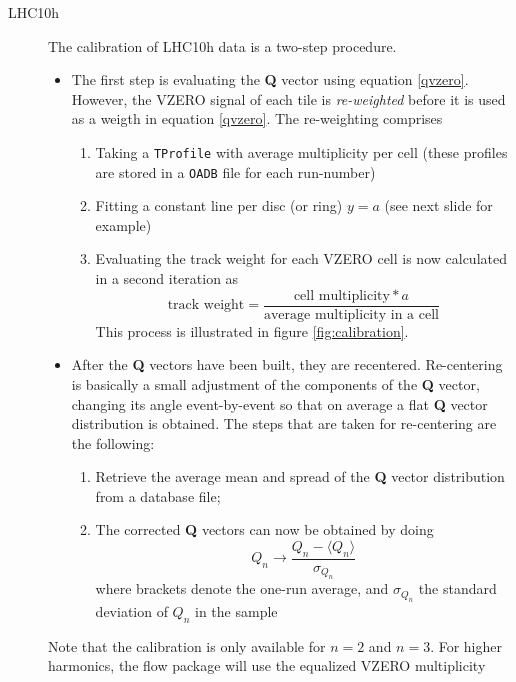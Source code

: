 \documentclass[a4paper]{book}
\numberwithin{equation}{subsection}
\begin{document}
\begin{description}
    \item [LHC10h]
The calibration of LHC10h data is a two-step procedure. 
\begin{itemize}
\item The first step is evaluating the \textbf{Q} vector using equation \ref{qvzero}. However, the VZERO signal of each tile is \emph{re-weighted} before it is used as a weigth in equation \ref{qvzero}. The re-weighting comprises 
\begin{enumerate}
\item Taking a \texttt{TProfile} with average multiplicity per cell (these profiles are stored in a \texttt{OADB} file for each run-number)
\item Fitting a constant line per disc (or ring) $y = a$ (see next slide for example)
\item Evaluating the track weight for each VZERO cell is now calculated in a second iteration as
\begin{equation}
\mbox{track weight} = \frac{\mbox{cell multiplicity} * a}{\mbox{average multiplicity in a cell}} \nonumber
\end{equation}
This process is illustrated in figure \ref{fig:calibration}.
\end{enumerate}
\item After the \textbf{Q} vectors have been built, they are recentered. Re-centering is basically a small adjustment of the components of the \textbf{Q} vector, changing its angle event-by-event so that on average a flat \textbf{Q} vector distribution is obtained. The steps that are taken for re-centering are the following:
\begin{enumerate}
\item Retrieve the average mean and spread of the \textbf{Q} vector distribution from a database file;
\item The corrected \textbf{Q} vectors can now be obtained by doing
\begin{equation}
Q_n \longrightarrow \frac{Q_n - \langle Q_n \rangle }{\sigma_{Q_n}} \nonumber
\end{equation}
where brackets denote the one-run average, and $\sigma_{Q_n}$ the standard deviation of $Q_n$ in the sample
\end{enumerate}
\end{itemize}
Note that the calibration is only available for $n=2$ and $n=3$. For higher harmonics, the flow package will use the equalized VZERO multiplicity

\end{description}
\end{document}
